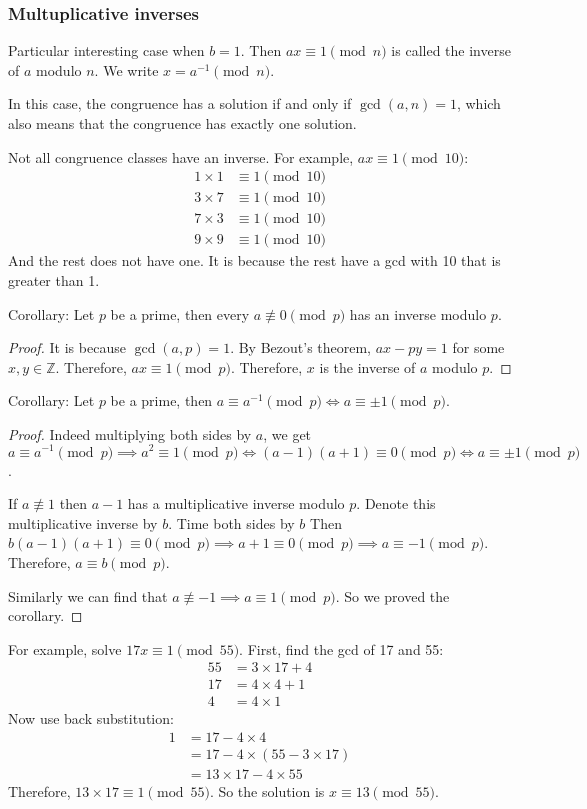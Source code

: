 \documentclass[letterpaper,12pt,oneside]{article}
\begin{document}
\subsubsection{Multuplicative inverses}
Particular interesting case when $b=1$. Then $ax\equiv 1 \pmod n$ is called the
inverse of $a$ modulo $n$. We write $x=a^{-1} \pmod n$.

In this case, the congruence has a solution if and only if $\gcd(a,n)=1$, which
also means that the congruence has exactly one solution.

Not all congruence classes have an inverse. For example, $ax\equiv 1 \pmod
    {10}$: \begin{align*}
    1\times 1 & \equiv 1 \pmod {10} \\
    3\times 7 & \equiv 1 \pmod {10} \\
    7\times 3 & \equiv 1 \pmod {10} \\
    9\times 9 & \equiv 1 \pmod {10}
\end{align*}
And the rest does not have one. It is because the rest have a gcd with 10 that is greater than 1.

Corollary: Let $p$ be a prime, then every $a\not\equiv 0 \pmod p$ has an
inverse modulo $p$. 
\begin{proof}
    It is because $\gcd(a,p)=1$. By Bezout's theorem, $ax-py=1$ for some $x,y\in \mathbb{Z}$. Therefore, $ax\equiv 1 \pmod p$. Therefore, $x$ is the inverse of $a$ modulo $p$.
\end{proof}


Corollary: Let $p$ be a prime, then $a\equiv a^{-1} \pmod p \iff a \equiv \pm 1
    \pmod p$.
\begin{proof}
    Indeed multiplying both sides by $a$, we get $a\equiv a^{-1} \pmod p \implies a^2\equiv 1 \pmod p \iff (a-1)(a+1)\equiv 0 \pmod p \iff a\equiv \pm 1 \pmod p$.

    If $a\not \equiv 1$ then $a-1$ has a multiplicative inverse modulo $p$. Denote
    this multiplicative inverse by $b$. Time both sides by $b$ Then
    $b(a-1)(a+1)\equiv 0 \pmod p \implies a+1\equiv 0 \pmod p \implies a\equiv -1
        \pmod p$. Therefore, $a\equiv b \pmod p$.

    Similarly we can find that $a\not \equiv -1 \implies a\equiv 1 \pmod p$. So we
    proved the corollary.
\end{proof}

For example, solve $17x\equiv 1 \pmod {55}$. First, find the gcd of 17 and 55: \begin{align*}
    55 & = 3\times 17+4 \\
    17 & = 4\times 4+1  \\
    4  & = 4\times 1
\end{align*}
Now use back substitution: \begin{align*}
    1 & = 17-4\times 4               \\
      & = 17-4\times (55-3\times 17) \\
      & = 13\times 17-4\times 55
\end{align*}
Therefore, $13\times 17\equiv 1 \pmod {55}$. So the solution is $x\equiv 13 \pmod {55}$.
\end{document}
